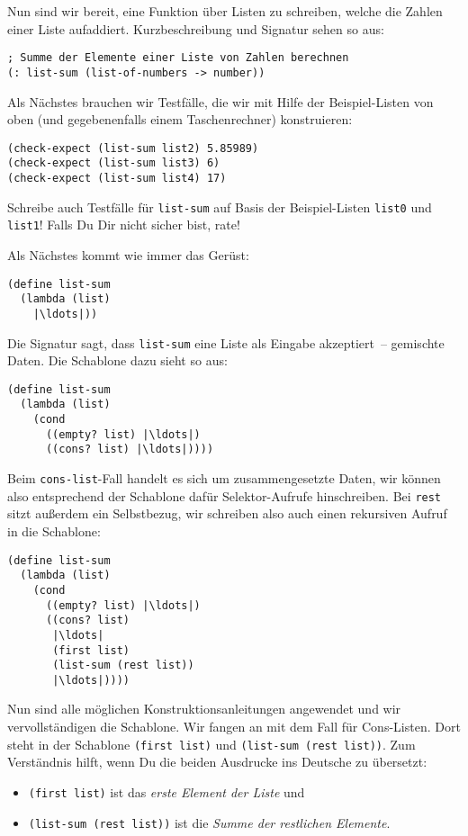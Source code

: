\label{sec:list-sum}
Nun sind wir bereit, eine Funktion über Listen zu schreiben, welche
die Zahlen einer Liste aufaddiert.  Kurzbeschreibung und Signatur
sehen so aus:
%
\begin{lstlisting}
; Summe der Elemente einer Liste von Zahlen berechnen
(: list-sum (list-of-numbers -> number))
\end{lstlisting}
%
Als Nächstes brauchen wir Testfälle, die wir mit Hilfe der
Beispiel-Listen von oben (und gegebenenfalls einem Taschenrechner)
konstruieren:
%
\begin{lstlisting}
(check-expect (list-sum list2) 5.85989)
(check-expect (list-sum list3) 6)
(check-expect (list-sum list4) 17)
\end{lstlisting}
%
\begin{aufgabeinline}
  Schreibe auch Testfälle für \lstinline{list-sum} auf Basis der
  Beispiel-Listen \lstinline{list0} und \lstinline{list1}!  Falls Du
  Dir nicht sicher bist, rate!
\end{aufgabeinline}
%
Als Nächstes kommt wie immer das Gerüst:
%
\begin{lstlisting}
(define list-sum
  (lambda (list)
    |\ldots|))
\end{lstlisting}
%
Die Signatur sagt, dass \lstinline{list-sum} eine Liste als Eingabe
akzeptiert~-- gemischte Daten.  Die Schablone dazu sieht so aus:
%
\begin{lstlisting}
(define list-sum
  (lambda (list)
    (cond
      ((empty? list) |\ldots|)
      ((cons? list) |\ldots|))))
\end{lstlisting}       
%
Beim \lstinline{cons-list}-Fall handelt es sich um zusammengesetzte
Daten, wir können also entsprechend der Schablone dafür
Selektor-Aufrufe hinschreiben.  Bei \lstinline{rest} sitzt außerdem
ein Selbstbezug, wir schreiben also auch einen rekursiven Aufruf in
die Schablone:
%
\begin{lstlisting}
(define list-sum
  (lambda (list)
    (cond
      ((empty? list) |\ldots|)
      ((cons? list)
       |\ldots|
       (first list)
       (list-sum (rest list))
       |\ldots|))))
\end{lstlisting}
%
Nun sind alle möglichen Konstruktionsanleitungen angewendet und wir
vervollständigen die Schablone.  Wir fangen an mit dem Fall für
Cons-Listen.  Dort steht in der Schablone \lstinline{(first list)} 
und \lstinline{(list-sum (rest list))}.  Zum Verständnis
hilft, wenn Du die beiden Ausdrucke ins Deutsche zu übersetzt:
%
\begin{itemize}
\item \lstinline{(first list)} ist das \emph{erste Element der Liste} und
\item \lstinline{(list-sum (rest list))} ist die \emph{Summe der restlichen
    Elemente}.
\end{itemize}

